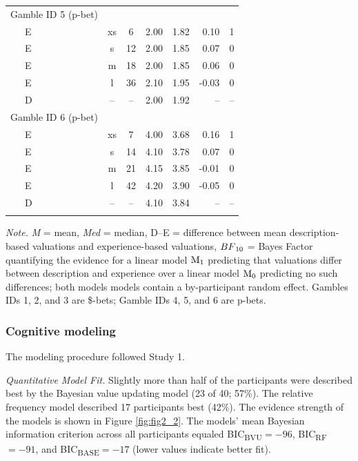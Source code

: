\documentclass[a4paper, man, floatsintext]{apa6}
\begin{document}
\begin{table}[tbp]
\begin{center}
\begin{threeparttable}
\begin{tabular}{lccccrr}
Gamble ID 5 (p-bet) &  &  &  &  &  & \\
\ \ \ E & xs & 6 & 2.00 & 1.82 & 0.10 & 1\\
\ \ \ E & s & 12 & 2.00 & 1.85 & 0.07 & 0\\
\ \ \ E & m & 18 & 2.00 & 1.85 & 0.06 & 0\\
\ \ \ E & l & 36 & 2.10 & 1.95 & -0.03 & 0\\
\ \ \ D & -- & -- & 2.00 & 1.92 & -- & --\\
Gamble ID 6 (p-bet) &  &  &  &  &  & \\
\ \ \ E & xs & 7 & 4.00 & 3.68 & 0.16 & 1\\
\ \ \ E & s & 14 & 4.10 & 3.78 & 0.07 & 0\\
\ \ \ E & m & 21 & 4.15 & 3.85 & -0.01 & 0\\
\ \ \ E & l & 42 & 4.20 & 3.90 & -0.05 & 0\\
\ \ \ D & -- & -- & 4.10 & 3.84 & -- & --\\
\bottomrule
\addlinespace
\end{tabular}

\begin{tablenotes}[para]
\normalsize{\textit{Note.} \textit{M} = mean, \textit{Med} = median, D--E = difference between mean description-based valuations and experience-based valuations, $BF\textsubscript{10}$ = Bayes Factor quantifying the evidence for a linear model $\mathrm{M}\textsubscript{1}$ predicting that valuations differ between description and experience over a linear model $\mathrm{M}\textsubscript{0}$ predicting no such differences; both models models contain a by-participant random effect. Gambles IDs 1, 2, and 3 are \$-bets; Gamble IDs 4, 5, and 6 are p-bets.}
\end{tablenotes}

\end{threeparttable}
\end{center}

\end{table}

\subsubsection{Cognitive modeling}

The modeling procedure followed Study 1.

\textit{Quantitative Model Fit.} Slightly more than half of the
participants were described best by the Bayesian value updating model
(23 of 40; 57\%). The relative frequency model described 17 participants
best (42\%). The evidence strength of the models is shown in Figure
\ref{fig:fig2_2}. The models' mean Bayesian information criterion across
all participants equaled BIC\textsubscript{BVU}\(= -96\),
BIC\textsubscript{RF}\(= -91\), and BIC\textsubscript{BASE}\(= -17\)
(lower values indicate better fit).
\end{document}
